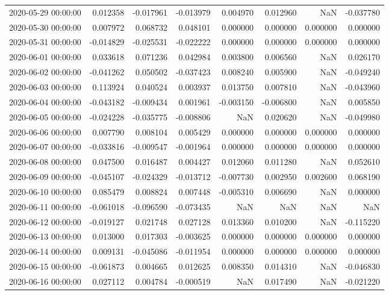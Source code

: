 \begin{tabular}{lrrrrrrr}
2020-05-29 00:00:00 & 0.012358 & -0.017961 & -0.013979 & 0.004970 & 0.012960 & NaN & -0.037780 \\
2020-05-30 00:00:00 & 0.007972 & 0.068732 & 0.048101 & 0.000000 & 0.000000 & 0.000000 & 0.000000 \\
2020-05-31 00:00:00 & -0.014829 & -0.025531 & -0.022222 & 0.000000 & 0.000000 & 0.000000 & 0.000000 \\
2020-06-01 00:00:00 & 0.033618 & 0.071236 & 0.042984 & 0.003800 & 0.006560 & NaN & 0.026170 \\
2020-06-02 00:00:00 & -0.041262 & 0.050502 & -0.037423 & 0.008240 & 0.005900 & NaN & -0.049240 \\
2020-06-03 00:00:00 & 0.113924 & 0.040524 & 0.003937 & 0.013750 & 0.007810 & NaN & -0.043960 \\
2020-06-04 00:00:00 & -0.043182 & -0.009434 & 0.001961 & -0.003150 & -0.006800 & NaN & 0.005850 \\
2020-06-05 00:00:00 & -0.024228 & -0.035775 & -0.008806 & NaN & 0.020620 & NaN & -0.049980 \\
2020-06-06 00:00:00 & 0.007790 & 0.008104 & 0.005429 & 0.000000 & 0.000000 & 0.000000 & 0.000000 \\
2020-06-07 00:00:00 & -0.033816 & -0.009547 & -0.001964 & 0.000000 & 0.000000 & 0.000000 & 0.000000 \\
2020-06-08 00:00:00 & 0.047500 & 0.016487 & 0.004427 & 0.012060 & 0.011280 & NaN & 0.052610 \\
2020-06-09 00:00:00 & -0.045107 & -0.024329 & -0.013712 & -0.007730 & 0.002950 & 0.002600 & 0.068190 \\
2020-06-10 00:00:00 & 0.085479 & 0.008824 & 0.007448 & -0.005310 & 0.006690 & NaN & 0.000000 \\
2020-06-11 00:00:00 & -0.061018 & -0.096590 & -0.073435 & NaN & NaN & NaN & NaN \\
2020-06-12 00:00:00 & -0.019127 & 0.021748 & 0.027128 & 0.013360 & 0.010200 & NaN & -0.115220 \\
2020-06-13 00:00:00 & 0.013000 & 0.017303 & -0.003625 & 0.000000 & 0.000000 & 0.000000 & 0.000000 \\
2020-06-14 00:00:00 & 0.009131 & -0.045086 & -0.011954 & 0.000000 & 0.000000 & 0.000000 & 0.000000 \\
2020-06-15 00:00:00 & -0.061873 & 0.004665 & 0.012625 & 0.008350 & 0.014310 & NaN & -0.046830 \\
2020-06-16 00:00:00 & 0.027112 & 0.004784 & -0.000519 & NaN & 0.017490 & NaN & -0.021220 \\

\end{tabular}

